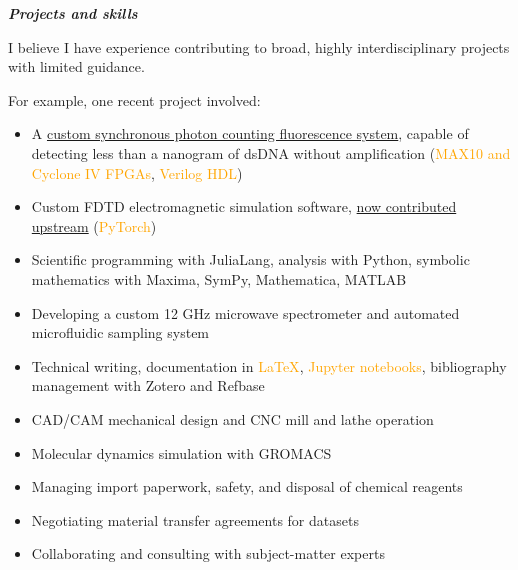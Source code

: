 \documentclass[fleqn,11pt]{article}
\newcommand{\ressection}[1]{\textbf{{\Large \textit{#1}}}\xrfill[0.1ex]{0.6pt}}
\newcommand{\sk}[1]{\textcolor{orange}{#1}}
\newcommand{\itemoptions}{\setlength{\itemindent}{-10pt} \setlength\itemsep{-1em}}
\begin{document}
\ressection{Projects and skills}

I believe I have experience contributing to broad, highly interdisciplinary projects with limited guidance.

For example, one recent project involved:
\begin{itemize}\itemoptions
	\item A \href{https://github.com/0xDBFB7/fluorescence_photon_counting/releases/download/v0.01/fluorescence.pdf}{custom synchronous photon counting fluorescence system}, capable of detecting less than a nanogram of dsDNA without amplification (\sk{MAX10 and Cyclone IV FPGAs}, \sk{Verilog HDL})
	\item Custom FDTD electromagnetic simulation software, \href{https://github.com/flaport/fdtd/pull/27}{now contributed upstream} (\sk{PyTorch})
	\item Scientific programming with JuliaLang, analysis with Python, symbolic mathematics with Maxima, SymPy, Mathematica, MATLAB
	\item Developing a custom 12 GHz microwave spectrometer and automated microfluidic sampling system
	\item Technical writing, documentation in \sk{LaTeX}, \sk{Jupyter notebooks}, bibliography management with Zotero and Refbase
	\item CAD/CAM mechanical design and CNC mill and lathe operation
	\item Molecular dynamics simulation with GROMACS
	\item Managing import paperwork, safety, and disposal of chemical reagents
	\item Negotiating material transfer agreements for datasets
	\item Collaborating and consulting with subject-matter experts
\end{itemize}
\end{document}
